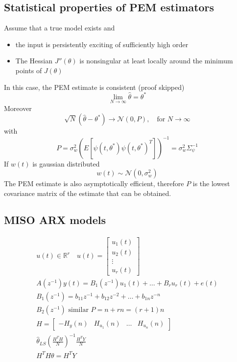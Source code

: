 \documentclass{book}
\theoremstyle{definition}
\theoremstyle{remark}
\theoremstyle{remark}
\begin{document}
\subsection{Statistical properties of PEM estimators}
Assume that a true model exists and
\begin{itemize}
    \item the input is persistently exciting of sufficiently high order
    \item The Hessian $J''(\theta)$ is nonsingular at least locally around the minimum points of $J(\theta)$
\end{itemize}
In this case, the PEM estimate is consistent (proof skipped)
\[
    \lim_{N\to\infty} \hat{\theta} = \theta^*
\]
Moreover
\[
    \sqrt{N}(\hat{\theta}-\theta^*) \to \mathcal{N}(0,P), \quad \text{for } N\to\infty
\]
with
\[
    P = \sigma_w^2 (E[\psi(t,\theta^*)\psi(t,\theta^*)^T])^{-1} = \sigma_w^2 \Sigma_{\psi}^{-1}
\]
If $w(t)$ is gaussian distributed
\[
    w(t)\sim \mathcal{N}(0,\sigma_w^2)
\]
The PEM estimate is also asymptotically efficient, therefore $P$ is the lowest covariance matrix of the estimate that can be obtained.
\subsection{MISO ARX models}
\begin{gather*}
    u(t) \in \mathbb{R}^r \quad u(t) = \begin{bmatrix}
        u_1(t) \\ u_2(t) \\ \vdots \\ u_r(t)
    \end{bmatrix}\\
    A(z^{-1})y(t) = B_1(z^{-1}) u_1(t) + \dots + B_r u_r(t) + e(t)\\
    B_1(z^{-1}) = b_{11}z^{-1} + b_{12}z^{-2} + \dots + b_{1n}z^{-n}\\
    B_2(z^{-1}) \text{ similar }
    P=n+rn=(r+1)n\\
    H=\begin{bmatrix}
        -H_y(n) & H_{u_1}(n) & \dots & H_{u_n}(n)
    \end{bmatrix}\\
    \hat{\theta}_{LS} \left( \displaystyle\frac{H^TH}{N} \right)^{-1}\displaystyle\frac{H^TY}{N}\\
    H^TH \theta = H^TY
\end{gather*}
\end{document}

